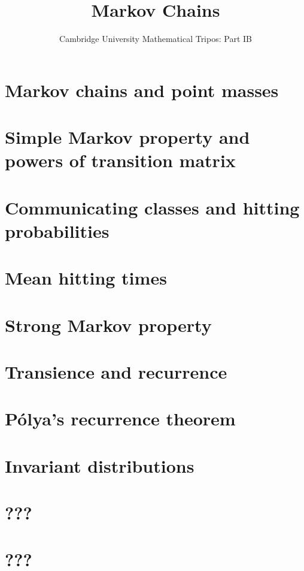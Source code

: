 \documentclass{article}
\title{Markov Chains}
\author{Cambridge University Mathematical Tripos: Part IB}
\begin{document}
\maketitle

\tableofcontentsnewpage{}

\section{Markov chains and point masses}

\section{Simple Markov property and powers of transition matrix}

\section{Communicating classes and hitting probabilities}

\section{Mean hitting times}

\section{Strong Markov property}

\section{Transience and recurrence}

\section{P\'olya's recurrence theorem}

\section{Invariant distributions}

\section{???}

\section{???}

\end{document}

